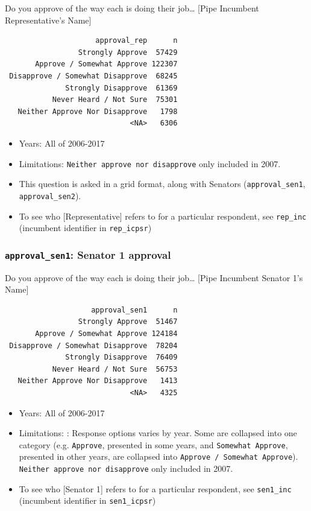 \documentclass[10pt,article,oneside]{memoir}
\theoremstyle{definition}
\begin{document}
Do you approve of the way each is doing their job\ldots{} {[}Pipe
Incumbent Representative's Name{]}

\begin{verbatim}
                     approval_rep      n
                 Strongly Approve  57429
       Approve / Somewhat Approve 122307
 Disapprove / Somewhat Disapprove  68245
              Strongly Disapprove  61369
           Never Heard / Not Sure  75301
   Neither Approve Nor Disapprove   1798
                             <NA>   6306
\end{verbatim}

\begin{itemize}
\tightlist
\item
  Years: All of 2006-2017
\item
  Limitations: \texttt{Neither\ approve\ nor\ disapprove} only included
  in 2007.
\item
  This question is asked in a grid format, along with Senators
  (\texttt{approval\_sen1}, \texttt{approval\_sen2}).
\item
  To see who {[}Representative{]} refers to for a particular respondent,
  see \texttt{rep\_inc} (incumbent identifier in \texttt{rep\_icpsr})
\end{itemize}

\subsubsection{\texorpdfstring{\texttt{approval\_sen1}: Senator 1
approval}{approval\_sen1: Senator 1 approval}}\label{approval_sen1-senator-1-approval}

Do you approve of the way each is doing their job\ldots{} {[}Pipe
Incumbent Senator 1's Name{]}

\begin{verbatim}
                    approval_sen1      n
                 Strongly Approve  51467
       Approve / Somewhat Approve 124184
 Disapprove / Somewhat Disapprove  78204
              Strongly Disapprove  76409
           Never Heard / Not Sure  56753
   Neither Approve Nor Disapprove   1413
                             <NA>   4325
\end{verbatim}

\begin{itemize}
\tightlist
\item
  Years: All of 2006-2017
\item
  Limitations: : Response options varies by year. Some are collapsed
  into one category (e.g. \texttt{Approve}, presented in some years, and
  \texttt{Somewhat\ Approve}, presented in other years, are collapsed
  into \texttt{Approve\ /\ Somewhat\ Approve}).
  \texttt{Neither\ approve\ nor\ disapprove} only included in 2007.
\item
  To see who {[}Senator 1{]} refers to for a particular respondent, see
  \texttt{sen1\_inc} (incumbent identifier in \texttt{sen1\_icpsr})
\end{itemize}
\end{document}
